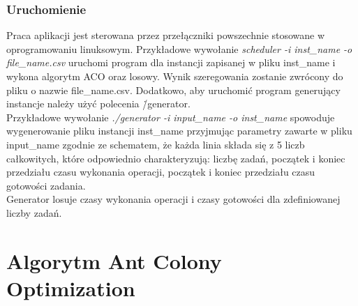 \documentclass[10pt,a4paper]{article}
\begin{document}
\subsubsection{Uruchomienie}
Praca aplikacji jest sterowana przez przełączniki powszechnie stosowane w
oprogramowaniu linuksowym.  Przykładowe wywołanie \textit{scheduler -i
inst\_name -o file\_name.csv} uruchomi program dla instancji zapisanej w pliku
inst\_name i wykona algorytm ACO oraz losowy. Wynik szeregowania zostanie
zwrócony do pliku o nazwie file\_name.csv.  Dodatkowo, aby uruchomić program
generujący instancje należy użyć polecenia \./generator.\\ Przykładowe wywołanie
\textit{./generator -i input\_name -o inst\_name } spowoduje wygenerowanie pliku
instancji inst\_name przyjmując parametry zawarte w pliku input\_name zgodnie ze
schematem, że każda linia składa się z 5 liczb całkowitych, które odpowiednio
charakteryzują: liczbę zadań, początek i koniec przedziału czasu wykonania
operacji, początek i koniec przedziału czasu gotowości zadania.\\ Generator
losuje czasy wykonania operacji i czasy gotowości dla zdefiniowanej liczby
zadań.

\section{Algorytm Ant Colony Optimization}
\end{document}
